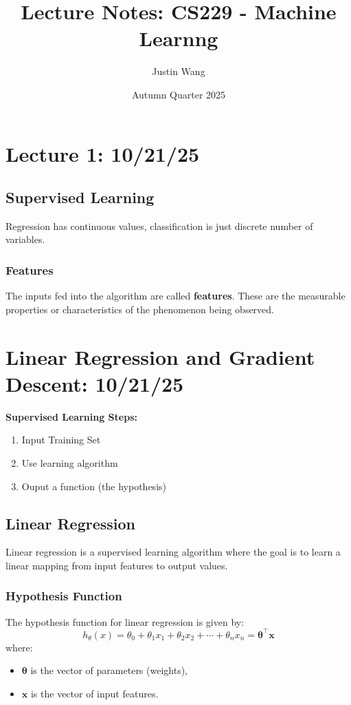 \documentclass[11pt]{article}
\title{Lecture Notes: CS229 - Machine Learnng}
\author{Justin Wang}
\date{Autumn Quarter 2025}
\begin{document}
\maketitle

\section{Lecture 1: 10/21/25}
\subsection*{Supervised Learning}
Regression has continuous values, classification is just discrete number of variables.

\subsubsection*{Features}
The inputs fed into the algorithm are called \textbf{features}. These are the measurable properties or characteristics of the phenomenon being observed.

\section{Linear Regression and Gradient Descent: 10/21/25}
\textbf{Supervised Learning Steps:}
\begin{enumerate}
    \item Input Training Set
    \item Use learning algorithm
    \item Ouput a function (the hypothesis)
\end{enumerate}

\subsection*{Linear Regression}
Linear regression is a supervised learning algorithm where the goal is to learn a linear mapping from input features to output values.

\subsubsection*{Hypothesis Function}
The hypothesis function for linear regression is given by:
\[
h_\theta(x) = \theta_0 + \theta_1 x_1 + \theta_2 x_2 + \cdots + \theta_n x_n = \bm{\theta}^\top \bm{x}
\]
where:
\begin{itemize}
    \item \( \bm{\theta} \) is the vector of parameters (weights),
    \item \( \bm{x} \) is the vector of input features.
\end{itemize}
\end{document}
